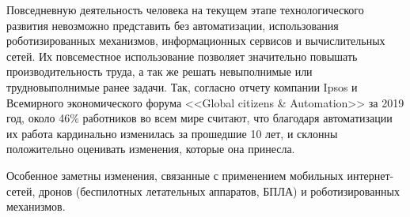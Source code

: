 
{\actuality} 
Повседневную деятельность человека на текущем этапе 
технологического развития невозможно представить без автоматизации, 
использования роботизированных механизмов, информационных сервисов и 
вычислительных сетей. 
Их повсеместное использование позволяет значительно повышать производительность 
труда, а так же решать невыполнимые или трудновыполнимые ранее задачи.
Так, согласно отчету компании Ipsos и Всемирного экономического форума 
<<Global citizens \& Automation>> за 2019 год, около 46\% работников во всем 
мире считают, что благодаря автоматизации их работа кардинально изменилась за 
прошедшие 10 лет, и склонны положительно оценивать изменения, которые она принесла.

Особенное заметны изменения, связанные с применением мобильных интернет-сетей, 
дронов (беспилотных летательных аппаратов, БПЛА) и роботизированных механизмов. 

